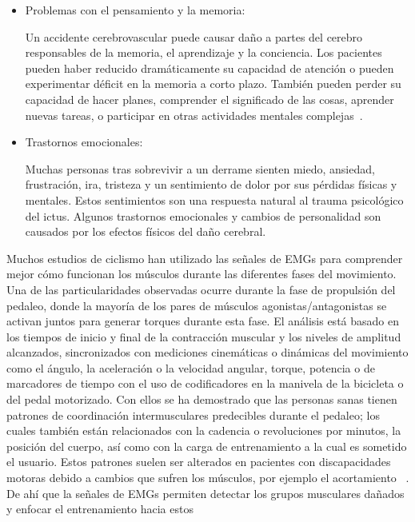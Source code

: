 \begin{itemize}
    \item Problemas con el pensamiento y la memoria:
    
    Un accidente cerebrovascular puede causar daño a partes del cerebro responsables de la memoria, el aprendizaje y la conciencia. Los pacientes pueden haber reducido dramáticamente su capacidad de atención o pueden experimentar déficit en la memoria a
    corto plazo. También pueden perder su capacidad de hacer planes, comprender el significado de las cosas, aprender nuevas tareas, o participar en otras actividades mentales complejas~\cite{post-strok}.
    
    \item Trastornos emocionales:
    
    Muchas personas tras sobrevivir a un derrame sienten miedo, ansiedad, frustración, ira, tristeza y un sentimiento de dolor por sus pérdidas físicas y mentales. Estos sentimientos son una respuesta natural al trauma psicológico del ictus. Algunos trastornos emocionales y cambios de personalidad son causados por los efectos físicos del daño cerebral.~\cite{post-strok} 
\end{itemize}

Muchos estudios de ciclismo han utilizado las señales de EMGs para comprender mejor cómo funcionan los músculos durante las diferentes fases del movimiento. Una de las particularidades observadas ocurre durante la fase de propulsión del pedaleo, donde la
mayoría de los pares de músculos agonistas/antagonistas se activan juntos para generar torques durante esta fase. El análisis está basado en los tiempos de inicio y final de la contracción muscular y los niveles de amplitud alcanzados, sincronizados con mediciones cinemáticas o dinámicas del movimiento como el ángulo, la aceleración o la velocidad angular, torque, potencia o de marcadores de tiempo con el uso de codificadores en la manivela de la bicicleta o del pedal motorizado. Con ellos se ha demostrado que las
personas sanas tienen patrones de coordinación intermusculares predecibles durante el pedaleo; los cuales también están relacionados con la cadencia o revoluciones por minutos, la posición del cuerpo, así como con la carga de entrenamiento a la cual es sometido el usuario. Estos patrones suelen ser alterados en pacientes con discapacidades motoras debido a cambios que sufren los músculos, por ejemplo el acortamiento ~\cite{johnston2007biomechanical}. De ahí que la señales de EMGs permiten detectar los grupos musculares dañados y enfocar el entrenamiento hacia estos ~\cite{hug2009electromyographic, kautz1998relationships}



